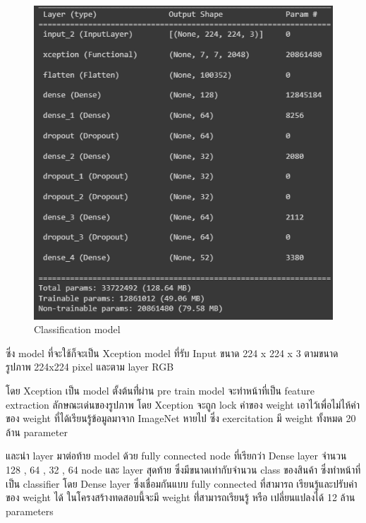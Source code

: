 \begin{figure}[h]
  \begin{center}

    \includegraphics[scale=0.6]{pic/model/model.png}

  \end{center}

  \caption[Classification model]{Classification model}
  \label{fig:Classification model}
\end{figure}

 

ซึ่ง model ที่จะใช้ก็จะเป็น Xception model ที่รับ Input ขนาด 224 x 224 x 3 ตามขนาดรูปภาพ 224x224 pixel และตาม layer RGB

โดย Xception เป็น model ตั้งต้นที่่ผ่าน pre train model จะทำหน้าที่เป็น feature extraction  ลักษณะเด่นของรูปภาพ
โดย Xception จะถูก lock ค่าของ weight เอาไว้เพื่อไม่ไห้ค่าของ weight ที่ได้เรียนรู้ข้อมูลมาจาก ImageNet หายไป
ซึ่ง exercitation มี weight ทั้งหมด 20 ล้าน parameter

และนำ layer มาต่อท้าย model ด้วย fully connected node ที่เรียกว่า Dense layer จำนวน 128 , 64 , 32 ,  64 node และ
layer สุดท้าย ซึ่งมีขนาดเท่ากับจำนวน class ของสินค้า ซึ่งทำหน้าที่เป็น classifier
โดย Dense layer ซึ่งเชื่อมกันแบบ fully connected ที่สามารถ เรียนรู้และปรับค่าของ weight ได้
ในโครงสร้างทดสอบนี้จะมี weight ที่่สามารถเรียนรู้ หรือ เปลี่ยนแปลงได้ 12 ล้าน parameters


